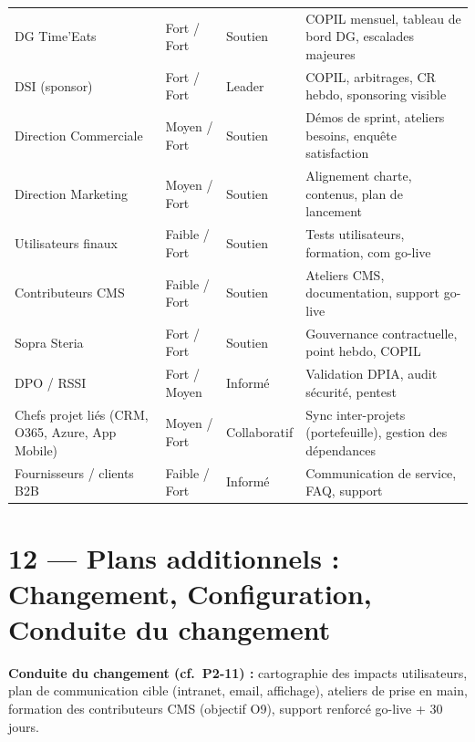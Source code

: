 \documentclass[11pt,a4paper,oneside]{report}
\begin{document}
\renewcommand{\arraystretch}{1.3}
\begin{tabularx}{\textwidth}{L{3.5cm} C{2cm} C{2.5cm} Y}
\toprule
{} &  &  &  \\
\midrule
DG Time'Eats          & Fort / Fort     & Soutien            & COPIL mensuel, tableau de bord DG, escalades majeures \\
DSI (sponsor)         & Fort / Fort     & Leader             & COPIL, arbitrages, CR hebdo, sponsoring visible \\
Direction Commerciale & Moyen / Fort    & Soutien            & Démos de sprint, ateliers besoins, enquête satisfaction \\
Direction Marketing   & Moyen / Fort    & Soutien            & Alignement charte, contenus, plan de lancement \\
Utilisateurs finaux   & Faible / Fort   & Soutien            & Tests utilisateurs, formation, com go-live \\
Contributeurs CMS     & Faible / Fort   & Soutien            & Ateliers CMS, documentation, support go-live \\
Sopra Steria          & Fort / Fort     & Soutien            & Gouvernance contractuelle, point hebdo, COPIL \\
DPO / RSSI            & Fort / Moyen    & Informé            & Validation DPIA, audit sécurité, pentest \\
Chefs projet liés (CRM, O365, Azure, App Mobile) & Moyen / Fort & Collaboratif & Sync inter-projets (portefeuille), gestion des dépendances \\
Fournisseurs / clients B2B & Faible / Fort & Informé         & Communication de service, FAQ, support \\
\bottomrule
\end{tabularx}

\section*{12 — Plans additionnels : Changement, Configuration, Conduite du changement}

\textbf{Conduite du changement (cf.\ P2-11) :} cartographie des impacts utilisateurs, plan
de communication cible (intranet, email, affichage), ateliers de prise en main, formation
des contributeurs CMS (objectif O9), support renforcé go-live + 30 jours.
\end{document}
